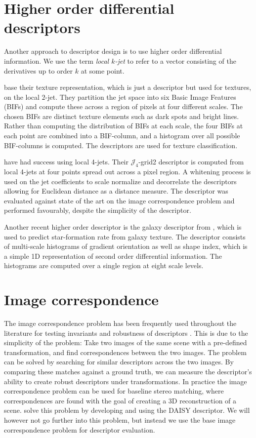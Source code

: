 \documentclass[thesis.tex]{subfiles}
\begin{document}
\section{Higher order differential descriptors}

Another approach to descriptor design is to use higher order differential information. We use the term \emph{local $k$-jet} to refer to a vector consisting of the derivatives up to order $k$ at some point.

\citet{crosier2010using} base their texture representation, which is just a descriptor but used for textures, on the local $2$-jet. They partition the jet space into six Basic Image Features (BIFs) and compute these across a region of pixels at four different scales. The chosen BIFs are distinct texture elements such as dark spots and bright lines. Rather than computing the distribution of BIFs at each scale, the four BIFs at each point are combined into a BIF-column, and a histogram over all possible BIF-columns is computed. The descriptors are used for texture classification.

\citet{larsen2012jet} have had success using local 4-jets. Their $\mathcal{J}_4$-grid2 descriptor is computed from local 4-jets at four points spread out across a pixel region. A whitening process is used on the jet coefficients to scale normalize and decorrelate the descriptors allowing for Euclidean distance as a distance measure. The descriptor was evaluated against state of the art on the image correspondence problem and performed favourably, despite the simplicity of the descriptor.

Another recent higher order descriptor is the galaxy descriptor from \citet{pedersen2013shape}, which is used to predict star-formation rate from galaxy texture. The descriptor consists of multi-scale histograms of gradient orientation as well as shape index, which is a simple 1D representation of second order differential information. The histograms are computed over a single region at eight scale levels.
%
\section{Image correspondence}
%
The image correspondence problem has been frequently used throughout the literature for testing invariants and robustness of descriptors \cite{lowe2004distinctive,mikolajczyk2005performance,ke2004pca,larsen2012jet,cui2009scale,toews2009sift}. This is due to the simplicity of the problem: Take two images of the same scene with a pre-defined transformation, and find correspondences between the two images. The problem can be solved by searching for similar descriptors across the two images. By comparing these matches against a ground truth, we can measure the descriptor's ability to create robust descriptors under transformations. In practice the image correspondence problem can be used for baseline stereo matching, where correspondences are found with the goal of creating a 3D reconstruction of a scene. \citet{tola2008fast} solve this problem by developing and using the DAISY descriptor. We will however not go further into this problem, but instead we use the base image correspondence problem for descriptor evaluation.
\end{document}
